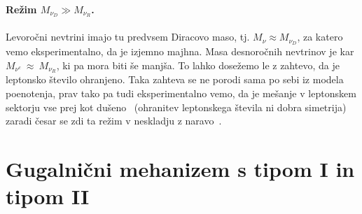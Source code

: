 \paragraph{Režim $M_{\nu_D} \gg M_{\nu_R}$.} Levoročni nevtrini imajo tu predvsem Diracovo maso, tj.
$M_\nu \approx M_{\nu_D}$, za katero vemo eksperimentalno, da je izjemno majhna. Masa desnoročnih
nevtrinov je kar $M_{\nu^c}\ \approx\ M_{\nu_R}$, ki pa mora biti še manjša. To lahko dosežemo le z
zahtevo, da je leptonsko število ohranjeno. Taka zahteva se ne porodi sama po sebi iz modela poenotenja,
prav tako pa tudi eksperimentalno vemo, da je mešanje v leptonskem sektorju vse prej kot
dušeno~\cite{pdg:neutrinos} (ohranitev leptonskega števila ni dobra simetrija) zaradi česar se zdi ta
režim v neskladju z naravo~\cite{strumia}.

\section{Gugalnični mehanizem s tipom I in tipom II}

